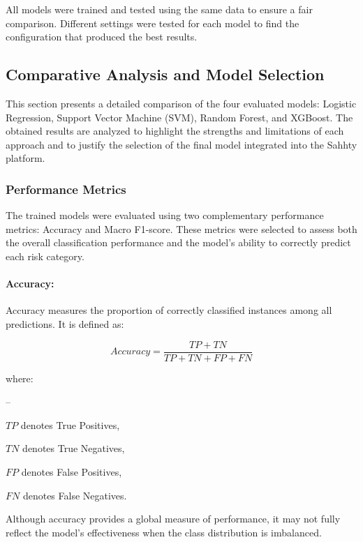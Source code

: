 All models were trained and tested using the same data to ensure a fair comparison. Different settings were tested for each model to find the configuration that produced the best results.



\subsection{Comparative Analysis and Model Selection}
This section presents a detailed comparison of the four evaluated models: Logistic Regression, Support Vector Machine (SVM), Random Forest, and XGBoost. The obtained results are analyzed to highlight the strengths and limitations of each approach and to justify the selection of the final model integrated into the Sahhty platform.
\subsubsection{Performance Metrics}

The trained models were evaluated using two complementary performance metrics: Accuracy and Macro F1-score. These metrics were selected to assess both the overall classification performance and the model's ability to correctly predict each risk category.

\paragraph{Accuracy:}

Accuracy measures the proportion of correctly classified instances among all predictions. It is defined as:

\begin{equation}
Accuracy = \frac{TP + TN}{TP + TN + FP + FN}
\end{equation}

where:
\begin{list}{--}{}
 \setlength\itemsep{-0.5em}    \item $TP$ denotes True Positives,
    \item $TN$ denotes True Negatives,
    \item $FP$ denotes False Positives,
    \item $FN$ denotes False Negatives.
\end{list}

Although accuracy provides a global measure of performance, it may not fully reflect the model's effectiveness when the class distribution is imbalanced.

